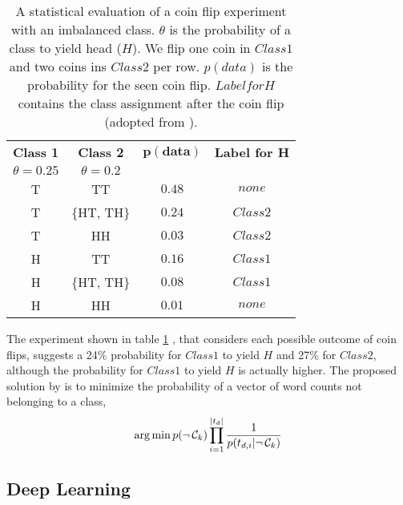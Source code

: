 \begin{table}[h!]
  \centering
  \caption{A statistical evaluation of a coin flip experiment with an imbalanced class. $\theta$ is the probability of a class to yield head ($H$). We flip one coin in $Class 1$ and two coins ins $Class 2$ per row. $p(data)$ is the probability for the seen coin flip. $Label for H$ contains the class assignment after the coin flip (adopted from \cite{Rennie2003}).}
  \setlength{\tabcolsep}{1.5em}
  \begin{tabular}{@{}cccc@{}}
    \toprule
    \textbf{Class 1} & \textbf{Class 2} & $\mathbf{p(data)}$ & \textbf{Label for H} \\
    $\theta = 0.25$ & $\theta=0.2$ & & \\
    \midrule
    T & TT & $0.48$ & $none$ \\
    T & \{HT, TH\} & $0.24$ & $Class 2$ \\
    T & HH & $0.03$ & $Class 2$ \\
    H & TT & $0.16$ & $Class 1$ \\
    H & \{HT, TH\} & $0.08$ & $Class 1$ \\
    H & HH & $0.01$ & $none$ \\
    \bottomrule
  \end{tabular}
  \label{table:coinflip}
\end{table}
The experiment shown in table \ref{table:coinflip} , that considers each possible outcome of coin flips, suggests a 24\% probability for $Class 1$ to yield $H$ and 27\% for $Class 2$, although the probability for $Class 1$ to yield $H$ is actually higher.
The proposed solution by \cite{Rennie2003} is to minimize the probability of a vector of word counts not belonging to a class,
\[\operatorname*{arg\,min} p(\neg\, \mathcal{C}_k) \prod_{i=1}^{|t_{d}|} \frac{1}{p(t_{d,i}|\neg\, \mathcal{C}_k)} \]

\subsection{Deep Learning}

